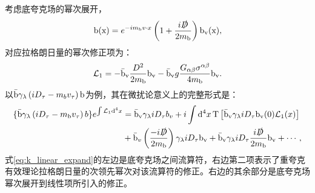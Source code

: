 考虑底夸克场的幂次展开，
\begin{equation}
   \mathrm{b(x)}=e^{-i m_{\mathrm{b}} v \cdot x}\left(1+\frac{i \slashed{D}}{2 m_{\mathrm{b}}}\right)\mathrm{ b_v(x)},
    \end{equation}
对应拉格朗日量的幂次修正项为：
\begin{equation}
    \mathcal{L}_1=-\mathrm{\bar{b}_v} \frac{D^2}{2 m_{\mathrm{b}}} \mathrm{b_v}-\mathrm{\bar{b}_v} g \frac{G_{\alpha \beta} \sigma^{\alpha \beta}}{4 m_{\mathrm{b}}}\mathrm{b_v}.
    \end{equation}
以$\mathrm{\bar{b}} \gamma_\lambda\left(i D_\tau-m_b v_\tau\right)\mathrm{b}$为例，其在微扰论意义上的完整形式是：
    \begin{equation}
        \begin{aligned}
            \{\mathrm{\bar{b}} \gamma_\lambda\left(i D_\tau-m_{\mathrm{b}} v_\tau\right) b\} e^{\int \mathcal{L}_1  \mathrm{d}^4 x}&=\mathrm{\bar{b}_v} \gamma_\lambda i D_\tau b_v+i \int \mathrm{d}^4 x \operatorname{T}\left[\mathrm{\bar{b}_v}\gamma_\lambda i D_\tau\mathrm{b_v(0)} \mathcal{L}_1(x)\right]\\
            &+\mathrm{\bar{b}}_v\left(\frac{-i\slashed{D}}{2 m_{\mathrm{b}}}\right) \gamma_\lambda i D_\tau \mathrm{b_v}+\mathrm{\bar{b}_v} \gamma_\lambda i D_\tau \frac{i \slashed{D}}{2 m_{\mathrm{b}}} \mathrm{b_v} +\cdots,\\
        \end{aligned}
    \label{eq:k_linear_expand}
        \end{equation}
式\eqref{eq:k_linear_expand}的左边是底夸克场之间流算符，右边第二项表示了重夸克有效理论拉格朗日量的次领先幂次对该流算符的修正。右边的其余部分是底夸克场幂次展开到线性项所引入的修正。

